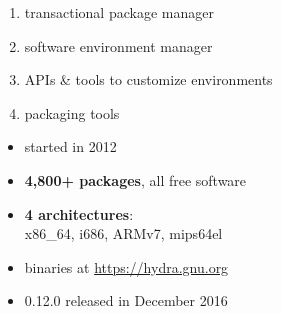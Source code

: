 \documentclass{beamer}
\newcommand{\highlight}[1]{\alert{\textbf{#1}}}
\begin{document}
\begin{frame}[plain]
\end{frame}

\begin{frame}
  \LARGE{
    \begin{enumerate}
    \item transactional package manager
    \item software environment manager
    \item APIs \& tools to customize environments
    \item packaging tools
    \end{enumerate}
  }
\end{frame}

\begin{frame}
  \Large{
  \begin{itemize}
    \item started in 2012
    \item \highlight{4,800+ packages}, all free software
    \item \highlight{4 architectures}:\\
      x86\_64, i686, ARMv7, mips64el
    \item binaries at \url{https://hydra.gnu.org}
    \item 0.12.0 released in December 2016
  \end{itemize}
  }
\end{frame}
\end{document}
